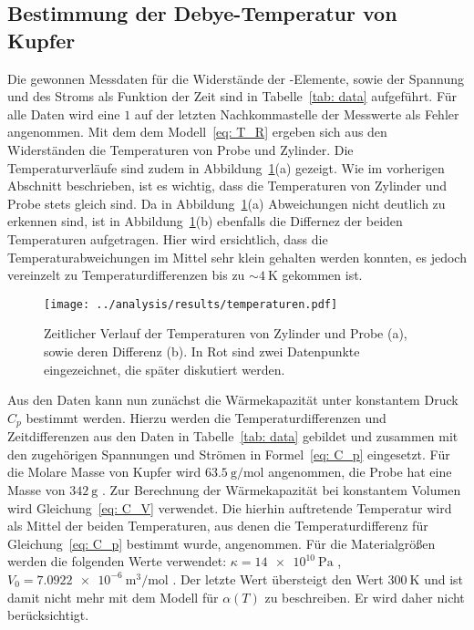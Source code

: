 \subsection{Bestimmung der Debye-Temperatur von Kupfer}
Die gewonnen Messdaten für die Widerstände der -Elemente, sowie der Spannung und des Stroms
als Funktion der Zeit sind in Tabelle~\ref{tab: data} aufgeführt. Für alle Daten wird eine $1$ auf der letzten
Nachkommastelle der Messwerte als Fehler angenommen.
Mit dem dem Modell~\eqref{eq: T_R} ergeben sich aus den Widerständen die Temperaturen von Probe und Zylinder.
Die Temperaturverläufe sind zudem in Abbildung~\ref{fig: temp}(a) gezeigt. Wie im vorherigen Abschnitt beschrieben, ist es
wichtig, dass die Temperaturen von Zylinder und Probe stets gleich sind. Da in Abbildung~\ref{fig: temp}(a) Abweichungen nicht
deutlich zu erkennen sind, ist in Abbildung~\ref{fig: temp}(b) ebenfalls die Differnez der beiden Temperaturen
aufgetragen. Hier wird ersichtlich, dass die Temperaturabweichungen im Mittel sehr klein gehalten werden konnten, es
jedoch vereinzelt zu Temperaturdifferenzen bis zu $\sim\!\SI{4}{\kelvin}$ gekommen ist.
\begin{figure}
\centering
\texttt{[image: ../analysis/results/temperaturen.pdf]}
\caption{Zeitlicher Verlauf der Temperaturen von Zylinder und Probe (a), sowie deren Differenz (b). In Rot sind
        zwei Datenpunkte eingezeichnet, die später diskutiert werden.}
\label{fig: temp}
\end{figure}



Aus den Daten kann nun zunächst die Wärmekapazität unter konstantem Druck $C_p$ bestimmt werden. Hierzu werden
die Temperaturdifferenzen und Zeitdifferenzen aus den Daten in Tabelle~\ref{tab: data} gebildet und zusammen mit den
zugehörigen Spannungen und Strömen in Formel~\eqref{eq: C_p} eingesetzt. Für die Molare Masse von Kupfer
wird $\SI{63.5}{\gram / \mol}$ \cite{molarmass} angenommen, die Probe hat eine Masse von $\SI{342}{\gram}$ \cite{anleitungV47}.
Zur Berechnung der Wärmekapazität
bei konstantem Volumen wird Gleichung~\eqref{eq: C_V} verwendet. Die hierhin auftretende Temperatur wird als Mittel
der beiden Temperaturen, aus denen die Temperaturdifferenz für Gleichung~\eqref{eq: C_p} bestimmt wurde, angenommen.
Für die Materialgrößen werden die folgenden Werte verwendet: $\kappa = \SI{14e10}{\pascal}$ \cite{gross}, $V_0 = \SI{7.0922e-6}{\meter^3 / \mol}$ \cite{volume}.
Der letzte Wert übersteigt den Wert $\SI{300}{\kelvin}$ und ist damit nicht mehr mit dem Modell für $\alpha(T)$
zu beschreiben. Er wird daher nicht berücksichtigt.

